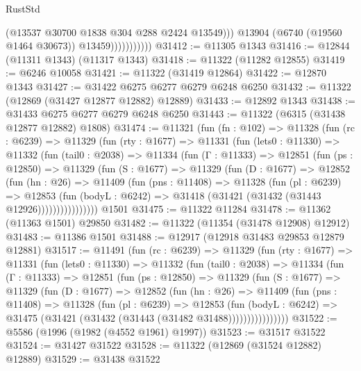 \begin{lexlean}{RustStd}
\begin{coremodule}
                              (@13537 @30700 @1838 @304 @288 @2424 @13549)))
                          @13904
                          (@6740 (@19560 @1464 @30673))
                          @13459)))))))))))
@31412 := @11305 @1343
@31416 := @12844 (@11311 @1343) (@11317 @1343)
@31418 := @11322 (@11282 @12855)
@31419 := @6246 @10058
@31421 := @11322 (@31419 @12864)
@31422 := @12870 @1343
@31427 := @31422 @6275 @6277 @6279 @6248 @6250
@31432 := @11322 (@12869 (@31427 @12877 @12882) @12889)
@31433 := @12892 @1343
@31438 := @31433 @6275 @6277 @6279 @6248 @6250
@31443 := @11322 (@6315 (@31438 @12877 @12882) @1808)
@31474 := @11321
    (fun (fn : @102) =>
    @11328
      (fun (rc : @6239) =>
      @11329
        (fun (rty : @1677) =>
        @11331
          (fun (lets0 : @11330) =>
          @11332
            (fun (tail0 : @2038) =>
            @11334
              (fun (Γ : @11333) =>
              @12851
                (fun (ps : @12850) =>
                @11329
                  (fun (S : @1677) =>
                  @11329
                    (fun (D : @1677) =>
                    @12852
                      (fun (hn : @26) =>
                      @11409
                        (fun (pns : @11408) =>
                        @11328
                          (fun (pl : @6239) =>
                          @12853
                            (fun (bodyL : @6242) =>
                            @31418 (@31421 (@31432 (@31443 @12926))))))))))))))))
    @1501
@31475 := @11322 @11284
@31478 := @11362 (@11363 @1501) @29850
@31482 := @11322 (@11354 (@31478 @12908) @12912)
@31483 := @11386 @1501
@31488 := @12917 (@12918 @31483 @29853 @12879 @12881)
@31517 := @11491
    (fun (rc : @6239) =>
    @11329
      (fun (rty : @1677) =>
      @11331
        (fun (lets0 : @11330) =>
        @11332
          (fun (tail0 : @2038) =>
          @11334
            (fun (Γ : @11333) =>
            @12851
              (fun (ps : @12850) =>
              @11329
                (fun (S : @1677) =>
                @11329
                  (fun (D : @1677) =>
                  @12852
                    (fun (hn : @26) =>
                    @11409
                      (fun (pns : @11408) =>
                      @11328
                        (fun (pl : @6239) =>
                        @12853
                          (fun (bodyL : @6242) =>
                          @31475 (@31421 (@31432 (@31443 (@31482 @31488))))))))))))))))
@31522 := @5586 (@1996 (@1982 (@4552 @1961) @1997))
@31523 := @31517 @31522
@31524 := @31427 @31522
@31528 := @11322 (@12869 (@31524 @12882) @12889)
@31529 := @31438 @31522

\end{coremodule}
\end{lexlean}

